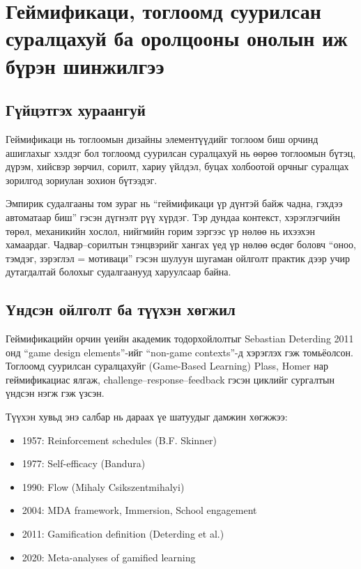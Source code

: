 \chapter*{Геймификаци, тоглоомд суурилсан суралцахуй ба оролцооны онолын иж бүрэн шинжилгээ}
\begin{sloppy}

\section*{Гүйцэтгэх хураангуй}
Геймификаци нь тоглоомын дизайны элементүүдийг тоглоом биш орчинд ашиглахыг хэлдэг бол тоглоомд суурилсан суралцахуй нь өөрөө тоглоомын бүтэц, дүрэм, хийсвэр зөрчил, сорилт, хариу үйлдэл, буцах холбоотой орчныг суралцах зорилгод зориулан зохион бүтээдэг.

Эмпирик судалгааны том зураг нь ``геймификаци үр дүнтэй байж чадна, гэхдээ автоматаар биш'' гэсэн дүгнэлт рүү хүрдэг. Тэр дундаа контекст, хэрэглэгчийн төрөл, механикийн хослол, нийгмийн горим зэргээс үр нөлөө нь ихээхэн хамаардаг. Чадвар–сорилтын тэнцвэрийг хангах үед үр нөлөө өсдөг боловч ``оноо, тэмдэг, зэрэглэл = мотиваци'' гэсэн шулуун шугаман ойлголт практик дээр учир дутагдалтай болохыг судалгаанууд харуулсаар байна.

\section*{Үндсэн ойлголт ба түүхэн хөгжил}
Геймификацийн орчин үеийн академик тодорхойлолтыг Sebastian Deterding 2011 онд ``game design elements''-ийг ``non-game contexts''-д хэрэглэх гэж томьёолсон. Тоглоомд суурилсан суралцахуйг (Game-Based Learning) Plass, Homer нар геймификациас ялгаж, challenge–response–feedback гэсэн циклийг сургалтын үндсэн нэгж гэж үзсэн.

Түүхэн хувьд энэ салбар нь дараах үе шатуудыг дамжин хөгжжээ:
\begin{itemize}
    \item 1957: Reinforcement schedules (B.F. Skinner)
    \item 1977: Self-efficacy (Bandura)
    \item 1990: Flow (Mihaly Csikszentmihalyi)
    \item 2004: MDA framework, Immersion, School engagement
    \item 2011: Gamification definition (Deterding et al.)
    \item 2020: Meta-analyses of gamified learning
\end{itemize}


\end{sloppy}
